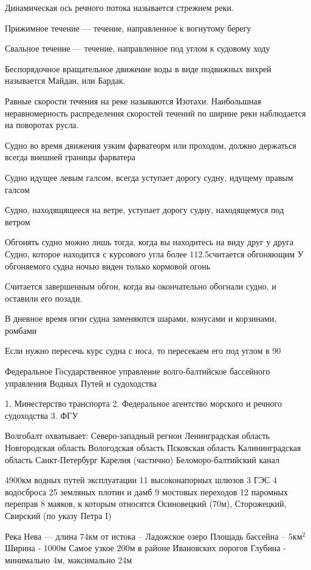 \documentclass{article}        %
\begin{document}
Динамическая ось речного потока называется стрежнем реки.

Прижимное течение --- течение, направленное к вогнутому берегу

Свальное течение --- течение, направленное под углом к судовому ходу

Беспорядочное вращательное движение воды в виде подвижных вихрей называется Майдан, или Бардак.

Равные скорости течения на реке называются Изотахи. Наибольшная неравномерность распределения скоростей течений по ширине реки наблюдается на поворотах русла.

Судно во время движения узким фарватеорм или проходом, должно держаться всегда внешней границы фарватера

Судно идущее левым галсом, всегда уступает дорогу судну, идущему правым галсом

Судно, находящящееся на ветре, уступает дорогу судну, находящемуся под ветром

Обгонять судно можно лишь тогда, когда вы находитесь на виду друг у друга
Судно, которое находится с курсового угла более 112.5\degree считается обгоняющим
У обгоняемого судна ночью виден только кормовой огонь

Считается завершенным обгон, когда вы окончательно обогнали судно, и оставили его позади.

В дневное время огни судна заменяются шарами, конусами и корзинами, ромбами

Если нужно пересечь курс судна с носа, то пересекаем его под углом в 90\degree

Федеральное Государственное управление волго-балтийское бассейного 
управления Водных Путей и судоходства

1. Минестерство транспорта
2. Федеральное агентство морского и речного судоходства
3. ФГУ

Волгобалт охватывает:
	Северо-западный регион
	Ленинградская область
	Новгородская область
	Вологодская область
	Псковская область
	Калининградская область
	Санкт-Петербург
	Карелия (частично)
	Беломоро-балтийский канал

4900км водных путей эксплуатации
11 высоконапорных шлюзов
3 ГЭС
4 водосброса
25 земляных плотин и дамб
9 мостовых переходов
12 паромных переправ
8 маяков, к которым относятся Осиновецкий (70м), Сторожецкий, Свирский (по указу Петра I)


Река Нева --- длина 74км от истока -- Ладожское озеро
Площадь бассейна -- $5км^2$
Ширина - 1000м
Самое узкое 200м в районе Ивановских порогов
Глубина - минимально 4м, максимально 24м
\end{document}

